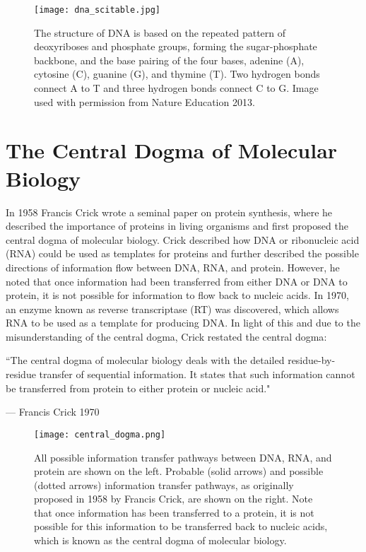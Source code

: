 \begin{figure}[!ht]
   \centering
   \texttt{[image: dna\_scitable.jpg]}
   \caption[DNA base pairing]{The structure of DNA is based on the repeated pattern of deoxyriboses and phosphate groups, forming the sugar-phosphate backbone, and the base pairing of the four bases, adenine (A), cytosine (C), guanine (G), and thymine (T). Two hydrogen bonds connect A to T and three hydrogen bonds connect C to G. Image used with permission from Nature Education 2013.}
   \label{fig:dna}
\end{figure}

\section{The Central Dogma of Molecular Biology}

In 1958 Francis Crick wrote a seminal paper on protein synthesis, where he described the importance of proteins in living organisms and first proposed the central dogma of molecular biology\cite{crick1958protein}. Crick described how DNA or ribonucleic acid (RNA) could be used as templates for proteins and further described the possible directions of information flow between DNA, RNA, and protein. However, he noted that once information had been transferred from either DNA or DNA to protein, it is not possible for information to flow back to nucleic acids. In 1970, an enzyme known as reverse transcriptase (RT) was discovered\cite{pmid4316301,pmid4316300}, which allows RNA to be used as a template for producing DNA. In light of this and due to the misunderstanding of the central dogma, Crick restated the central dogma\cite{CRICK1970}:

\epigraph{``The central dogma of molecular biology deals with the detailed residue-by-residue transfer of sequential information. It states that such information cannot be transferred from protein to either protein or nucleic acid."}{--- \textup{Francis Crick 1970}}

\begin{figure}[!ht]
   \centering
   \texttt{[image: central\_dogma.png]}
   \caption[The central dogma]{All possible information transfer pathways between DNA, RNA, and protein are shown on the left. Probable (solid arrows) and possible (dotted arrows) information transfer pathways, as originally proposed in 1958 by Francis Crick\cite{crick1958protein}, are shown on the right. Note that once information has been transferred to a protein, it is not possible for this information to be transferred back to nucleic acids, which is known as the central dogma of molecular biology.}
   \label{fig:central_dogma}
\end{figure}

